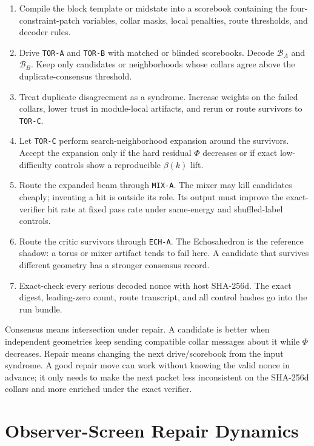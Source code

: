 \documentclass[11pt]{article}
\theoremstyle{definition}
\theoremstyle{remark}
\begin{document}
\begin{enumerate}
\item Compile the block template or midstate into a scorebook containing the
four-constraint-patch variables, collar masks, local penalties, route thresholds, and
decoder rules.
\item Drive \texttt{TOR-A} and \texttt{TOR-B} with matched or blinded scorebooks.
Decode \(\mathcal B_A\) and \(\mathcal B_B\). Keep only candidates or
neighborhoods whose collars agree above the duplicate-consensus threshold.
\item Treat duplicate disagreement as a syndrome. Increase weights on the failed
collars, lower trust in module-local artifacts, and rerun or route survivors to
\texttt{TOR-C}.
\item Let \texttt{TOR-C} perform search-neighborhood expansion around the
survivors. Accept the expansion only if the hard residual \(\Phi\) decreases or
if exact low-difficulty controls show a reproducible \(\beta(k)\) lift.
\item Route the expanded beam through \texttt{MIX-A}. The mixer may kill
candidates cheaply; inventing a hit is outside its role. Its output must improve
the exact-verifier hit rate at fixed pass rate under same-energy and
shuffled-label controls.
\item Route the critic survivors through \texttt{ECH-A}. The Echosahedron is the
reference shadow: a torus or mixer artifact tends to fail here. A candidate that
survives different geometry has a stronger consensus record.
\item Exact-check every serious decoded nonce with host SHA-256d. The exact
digest, leading-zero count, route transcript, and all control hashes go into the
run bundle.
\end{enumerate}

Consensus means intersection under repair. A candidate is better when
independent geometries keep sending compatible collar messages about it while
\(\Phi\) decreases. Repair means changing the next drive/scorebook from the
input syndrome. A good repair move can work without knowing the valid nonce in
advance; it only needs to make the next packet less inconsistent on the SHA-256d
collars and more enriched under the exact verifier.

\section{Observer-Screen Repair Dynamics}
\end{document}
